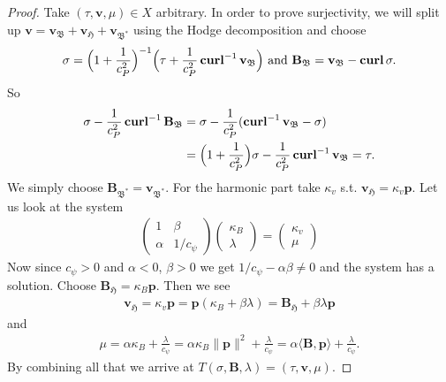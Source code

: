 \documentclass[../master_thesis.tex]{subfiles}
\begin{document}
\begin{proof}
    Take $(\tau, \mathbf{v},\mu) \in X$ arbitrary. In order to prove surjectivity, 
    we will split up $\mathbf{v} = \mathbf{v}_\mathfrak{B}
    + \mathbf{v}_\mathfrak{H} + \mathbf{v}_\mathfrak{B^*}$ using the Hodge decomposition
    and choose 
    \begin{align*}
        \sigma = \Big(1+\frac{1}{c_P^2}\Big)^{-1} 
            \Big(\tau + \frac{1}{c_P^2} \veccurl^{-1} \mathbf{v}_\mathfrak{B}\Big) 
        \text{ and }\mathbf{B}_\mathfrak{B} = \mathbf{v}_\mathfrak{B} - \veccurl \sigma.
    \end{align*}
    So 
    \begin{align*}
        \sigma -  \frac{1}{c_P^2} \veccurl^{-1}\mathbf{B}_\mathfrak{B} 
        &= \sigma -  \frac{1}{c_P^2} (\veccurl^{-1} \mathbf{v}_\mathfrak{B} - \sigma)
        \\ &= \Big(1+\frac{1}{c_P^2}\Big)\sigma - \frac{1}{c_P^2} \veccurl^{-1} \mathbf{v}_\mathfrak{B}
        = \tau.
    \end{align*}
    We simply choose $\mathbf{B}_\mathfrak{B^*} = \mathbf{v}_\mathfrak{B^*}$.
    For the harmonic part take $\kappa_v$ s.t. $\mathbf{v}_\mathfrak{H} = \kappa_v \mathbf{p}$.
    Let us look at the system 
    \begin{align*}
        \begin{pmatrix}
            1 & \beta 
            \\ \alpha & 1/c_\psi
        \end{pmatrix}
        \begin{pmatrix}
            \kappa_B 
            \\ \lambda 
        \end{pmatrix}
        = 
        \begin{pmatrix}
            \kappa_v 
            \\ \mu
        \end{pmatrix}
    \end{align*}
    Now since $c_\psi > 0$ and $\alpha < 0$, $\beta > 0$ we get 
    $1/c_\psi - \alpha \beta \neq 0$ and the system has a solution. 
    Choose $\mathbf{B}_\mathfrak{H} = \kappa_B \mathbf{p}$.
    Then we see 
    \begin{align*}
        \mathbf{v}_\mathfrak{H} = \kappa_v \mathbf{p} = \mathbf{p}(\kappa_B + \beta \lambda) 
        =  \mathbf{B}_\mathfrak{H} + \beta \lambda \mathbf{p}
    \end{align*}
    and 
    \begin{align*}
        \mu = \alpha \kappa_B + \frac{\lambda}{c_\psi}
        = \alpha \kappa_B \lVert \mathbf{p} \rVert^2 + \frac{\lambda}{c_\psi}
        = \alpha \langle \mathbf{B}, \mathbf{p} \rangle + \frac{\lambda}{c_\psi}.
    \end{align*}
    By combining all that we arrive at 
    $T(\sigma,\mathbf{B}, \lambda) = (\tau, \mathbf{v}, \mu)$.
\end{proof}
\end{document}
